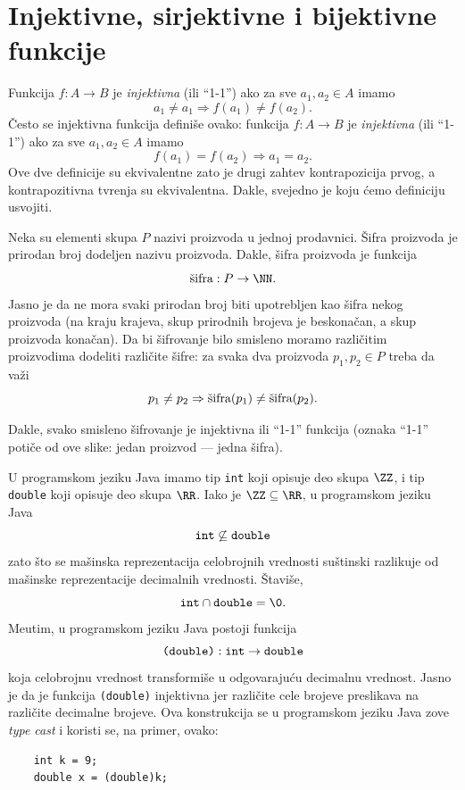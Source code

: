 \section{Injektivne, sirjektivne i bijektivne funkcije}

Funkcija $f : A \to B$ je \emph{injektivna} (ili ``1-1'') ako za sve $a_1, a_2 \in A$ imamo
$$
  a_1 \ne a_1 \Rightarrow f(a_1) \ne f(a_2).
$$
\v Cesto se injektivna funkcija defini\v se ovako: funkcija
$f : A \to B$ je \emph{injektivna} (ili ``1-1'') ako za sve $a_1, a_2 \in A$ imamo
$$
  f(a_1) = f(a_2) \Rightarrow a_1 = a_2.
$$
Ove dve definicije su ekvivalentne zato je drugi zahtev kontrapozicija prvog, a kontrapozitivna
tvr\dj enja su ekvivalentna. Dakle, svejedno je koju \'cemo definiciju usvojiti.

\begin{EX}
  Neka su elementi skupa $P$ nazivi proizvoda u jednoj prodavnici. \v Sifra proizvoda je prirodan broj
  dodeljen nazivu proizvoda. Dakle, \v sifra proizvoda je funkcija
  $$
    \hbox{\v sifra} : P \to \NN.
  $$
  Jasno je da ne mora svaki prirodan broj biti upotrebljen kao \v sifra nekog proizvoda
  (na kraju krajeva, skup prirodnih brojeva je beskona\v can, a skup proizvoda kona\v can).
  Da bi \v sifrovanje bilo smisleno moramo razli\v citim proizvodima dodeliti razli\v cite \v sifre:
  za svaka dva proizvoda $p_1, p_2 \in P$ treba da va\v zi
  $$
    p_1 \ne p_2 \Rightarrow \hbox{\v sifra}(p_1) \ne \hbox{\v sifra}(p_2).
  $$
  \begin{center}
    
  \end{center}
  Dakle, svako smisleno \v sifrovanje je injektivna ili ``1-1'' funkcija (oznaka ``1-1''
  poti\v ce od ove slike: jedan proizvod --- jedna \v sifra).
\end{EX}

\begin{EX}
  U programskom jeziku Java imamo tip \verb`int` koji opisuje deo skupa $\ZZ$, i tip \verb`double` koji
  opisuje deo skupa $\RR$. Iako je $\ZZ \subseteq \RR$, u programskom jeziku Java
  $$
    \hbox{\texttt{int}} \not\subseteq \hbox{\texttt{double}}
  $$
  zato \v sto se ma\v sinska reprezentacija celobrojnih vrednosti su\v stinski razlikuje od ma\v sinske reprezentacije
  decimalnih vrednosti. \v Stavi\v se,
  $$
    \hbox{\texttt{int}} \cap \hbox{\texttt{double}} = \0.
  $$
  Me\dj utim, u programskom jeziku Java postoji funkcija
  $$
    \hbox{\texttt{(double)}} : \hbox{\texttt{int}} \to \hbox{\texttt{double}}
  $$
  koja celobrojnu vrednost transformi\v se u odgovaraju\'cu decimalnu vrednost. Jasno je da je funkcija
  \verb`(double)` injektivna jer razli\v cite cele brojeve preslikava na razli\v cite decimalne brojeve.
  Ova konstrukcija se u programskom jeziku Java zove \emph{type cast} i koristi se, na primer, ovako:
  {\small
\begin{verbatim}
    int k = 9;
    double x = (double)k;
\end{verbatim}
  }
\end{EX}

